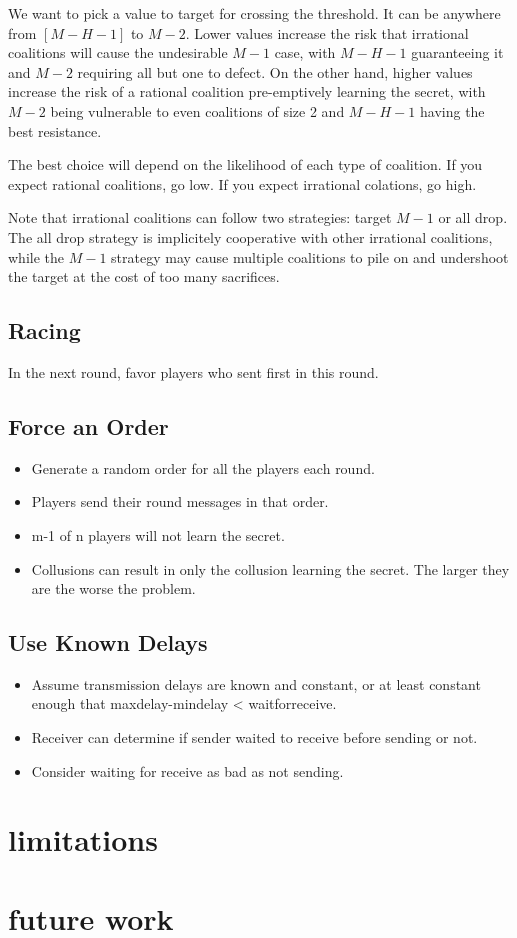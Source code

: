 \documentclass{article}
\begin{document}
We want to pick a value to target for crossing the threshold. It can be anywhere from $[M-H-1]$ to $M - 2$. Lower values increase the risk that irrational coalitions will cause the undesirable $M-1$ case, with $M-H-1$ guaranteeing it and $M-2$ requiring all but one to defect. On the other hand, higher values increase the risk of a rational coalition pre-emptively learning the secret, with $M-2$ being vulnerable to even coalitions of size 2 and $M-H-1$ having the best resistance.

The best choice will depend on the likelihood of each type of coalition. If you expect rational coalitions, go low. If you expect irrational colations, go high.

Note that irrational coalitions can follow two strategies: target $M-1$ or all drop. The all drop strategy is implicitely cooperative with other irrational coalitions, while the $M-1$ strategy may cause multiple coalitions to pile on and undershoot the target at the cost of too many sacrifices.

\subsection{Racing}
In the next round, favor players who sent first in this round.

\subsection{Force an Order}
\begin{itemize}
	\item Generate a random order for all the players each round.
	\item Players send their round messages in that order.
	\item m-1 of n players will not learn the secret.
	\item Collusions can result in only the collusion learning the secret. The larger they are the worse the problem.
\end{itemize}

\subsection{Use Known Delays}
\begin{itemize}
	\item Assume transmission delays are known and constant, or at least constant enough that maxdelay-mindelay < waitforreceive.
	\item Receiver can determine if sender waited to receive before sending or not.
	\item Consider waiting for receive as bad as not sending.
\end{itemize}

\section{limitations}
\section{future work}
\end{document}
